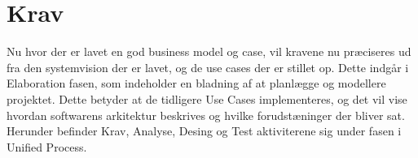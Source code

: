 \chapter{Krav}\label{ch:krav}


Nu hvor der er lavet en god business model og case, vil kravene nu præciseres ud fra den systemvision der er lavet, og de use cases der er stillet op. Dette indgår i Elaboration fasen, som indeholder en bladning af at planlægge og modellere projektet. Dette betyder at de tidligere Use Cases implementeres, og det vil vise hvordan softwarens arkitektur beskrives og hvilke forudstæninger der bliver sat. Herunder befinder Krav, Analyse, Desing og Test aktiviterene sig under fasen i Unified Process\cite{UnifiedProcess}. 



 